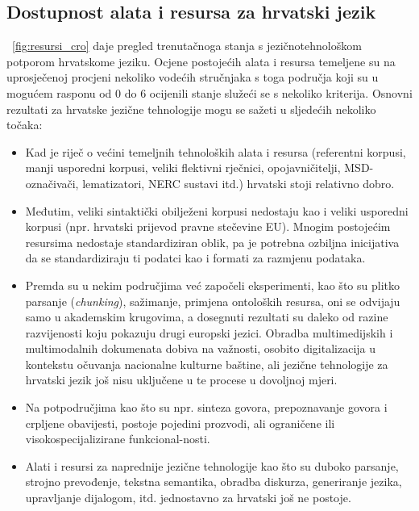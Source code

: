\begin{multicols}{2}
\subsection{Dostupnost alata i resursa za hrvatski jezik}

~\ref{fig:resursi_cro} daje pregled trenutačnoga stanja s jezičnotehnološkom potporom hrvatskome jeziku. Ocjene postojećih alata i resursa temeljene su na uprosječenoj procjeni nekoliko vodećih stručnjaka s toga područja koji su u mogućem rasponu od 0 do 6 ocijenili stanje služeći se s nekoliko kriterija. Osnovni rezultati za hrvatske jezične tehnologije mogu se sažeti u sljedećih nekoliko točaka:
\begin{itemize}
\item Kad je riječ o većini temeljnih tehnoloških alata i resursa (referentni korpusi, manji usporedni korpusi, veliki flektivni rječnici, opojavničitelji, MSD-označivači, lematizatori, NERC sustavi itd.) hrvatski stoji relativno dobro.
\item Međutim, veliki sintaktički obilježeni korpusi nedostaju kao i veliki usporedni korpusi (npr. hrvatski prijevod pravne stečevine EU). Mnogim postojećim resursima nedostaje standardiziran oblik, pa je potrebna ozbiljna inicijativa da se standardiziraju ti podatci kao i formati za razmjenu podataka.
\item Premda su u nekim područjima već započeli eksperimenti, kao što su plitko parsanje (\emph{chunking}), sažimanje, primjena ontoloških resursa, oni se odvijaju samo u akademskim krugovima, a dosegnuti rezultati su daleko od razine razvijenosti koju pokazuju drugi europski jezici. Obradba multimedijskih i multimodalnih dokumenata dobiva na važnosti, osobito digitalizacija u kontekstu očuvanja nacionalne kulturne baštine, ali jezične tehnologije za hrvatski jezik još nisu uključene u te procese u dovoljnoj mjeri.
\item Na potpodručjima kao što su npr. sinteza govora, prepoznavanje govora i crpljene obavijesti, postoje pojedini prozvodi, ali ograničene ili visokospecijalizirane funkcional-nosti.
\item Alati i resursi za naprednije jezične tehnologije kao što su duboko parsanje, strojno prevođenje, tekstna semantika, obradba diskurza, generiranje jezika, upravljanje dijalogom, itd. jednostavno za hrvatski još ne postoje.
\end{itemize}


\end{multicols}

